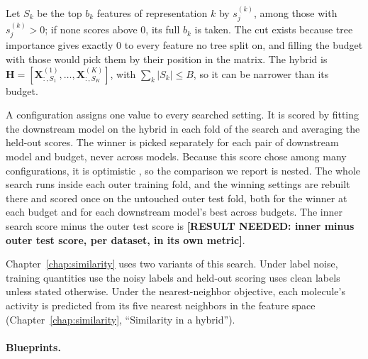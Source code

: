 Let $S_k$ be the top $b_k$ features of representation $k$ by $s^{(k)}_j$, among those with $s^{(k)}_j > 0$; if none scores above 0, its full $b_k$ is taken. The cut exists because tree importance gives exactly 0 to every feature no tree split on, and filling the budget with those would pick them by their position in the matrix. The hybrid is $\mathbf{H} = [\mathbf{X}^{(1)}_{:,S_1}, \dots, \mathbf{X}^{(K)}_{:,S_K}]$, with $\sum_k |S_k| \le B$, so it can be narrower than its budget.

A configuration assigns one value to every searched setting. It is scored by fitting the downstream model on the hybrid in each fold of the search and averaging the held-out scores. The winner is picked separately for each pair of downstream model and budget, never across models. Because this score chose among many configurations, it is optimistic \citep{Varma2006, Cawley2010}, so the comparison we report is nested. The whole search runs inside each outer training fold, and the winning settings are rebuilt there and scored once on the untouched outer test fold, both for the winner at each budget and for each downstream model's best across budgets. The inner search score minus the outer test score is \textbf{[RESULT NEEDED: inner minus outer test score, per dataset, in its own metric]}.

Chapter~\ref{chap:similarity} uses two variants of this search. Under label noise, training quantities use the noisy labels and held-out scoring uses clean labels unless stated otherwise. Under the nearest-neighbor objective, each molecule's activity is predicted from its five nearest neighbors in the feature space (Chapter~\ref{chap:similarity}, ``Similarity in a hybrid'').



\paragraph{Blueprints.}


